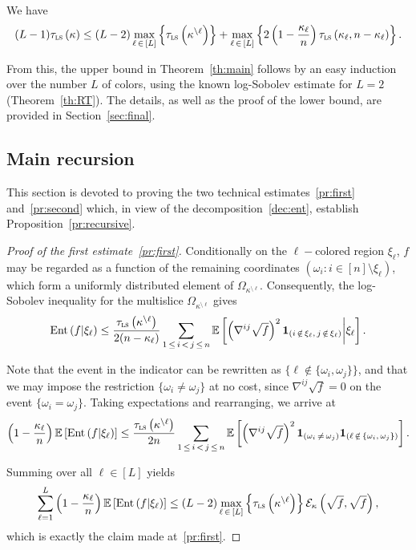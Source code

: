 \documentclass[AHL,Unicode,longabstracts,published]{cedram}
\newcommand{\EE}{\mathbb{E}}
\newcommand{\cE}{\mathcal{E}}
\newcommand{\tls}{\tau_{\textsc{ls}}}
\newcommand{\bfun}{\bf 1}
\DeclareMathOperator{\ent}{Ent}
\begin{document}
\begin{prop}\label{pr:recursive}
We have
\[
(L-1)\tls\left(\kappa\right) \le (L-2)\max_{\ell\,\in\,[L]}\left\{\tls\left(\kappa^{\setminus \ell}\right)\right\}+\max_{\ell\,\in\,[L]}\left\{2\left(1-\frac{\kappa_\ell}n\right)\tls\left(\kappa_\ell,n-\kappa_\ell\right)\right\}.
\]
\end{prop}

From this, the upper bound in Theorem~\ref{th:main} follows by an easy induction over the number $L$ of colors, using the known log-Sobolev estimate for $L=2$ (Theorem~\ref{th:RT}). The details, as well as the proof of the lower bound, are provided in Section~\ref{sec:final}.

\subsection{Main recursion}
This section is devoted to proving the two technical estimates~\eqref{pr:first} and~\eqref{pr:second} which, in view of the decomposition~\eqref{dec:ent}, establish Proposition~\ref{pr:recursive}.


\begin{proof}[Proof of the first estimate~\eqref{pr:first}]
Conditionally on the $\ell-$colored region $\xi_\ell$, $f$ may be regarded as a function of the remaining coordinates $(\omega_i\colon i\in[n]\setminus \xi_\ell)$, which form a uniformly distributed element of $\Omega_{\kappa^{\setminus\ell}}$. Consequently, the log-Sobolev inequality for the multislice $\Omega_{\kappa^{\setminus\ell}}$ gives
\[
\ent\left(f|\xi_\ell\right) \le \frac{\tls\left(\kappa^{\setminus\ell}\right)}{2(n-\kappa_\ell)}\sum_{1\,\le\,i\,<\,j\,\le\,n}\EE\left[\left(\nabla^{ij}\sqrt{f}\right)^2{\bfun}_{(i\,\notin\,\xi_\ell,\,j\,\notin\,\xi_\ell)}\middle|\xi_\ell\right].
\]

Note that the event in the indicator can be rewritten as $\{\ell\notin\{\omega_i,\omega_j\}\}$, and that we may impose the restriction $\{\omega_i\ne\omega_j\}$ at no cost, since $\nabla^{ij}\sqrt{f}=0$ on the event $\{\omega_i=\omega_j\}$. Taking expectations and rearranging, we arrive at
\[
\left(1-\frac{\kappa_\ell}{n}\right)\EE\left[\ent\left(f|\xi_\ell\right)\right] \le \frac{\tls\left(\kappa^{\setminus\ell}\right)}{2n}\sum_{1\,\le\,i\,<\,j\,\le\,n}\EE\left[\left(\nabla^{ij}\sqrt{f}\right)^2{\bfun}_{\left(\omega_i\,\ne\,\omega_j\right)}{\bfun}_{\left(\ell\,\notin\,\left\{\omega_i,\,\omega_j\right\}\right)}\right].
\]

Summing over all $\ell\in[L]$ yields
\[
\sum_{\ell=1}^L\left(1-\frac{\kappa_\ell}{n}\right)\EE\left[\ent\left(f|\xi_\ell\right)\right] \le (L-2)\max_{\ell\,\in\,[L]}\left\{\tls\left(\kappa^{\setminus\ell}\right)\right\}\cE_\kappa\left(\sqrt{f},\sqrt{f}\right),
\]
which is exactly the claim made at~\eqref{pr:first}.
\end{proof}
\end{document}
